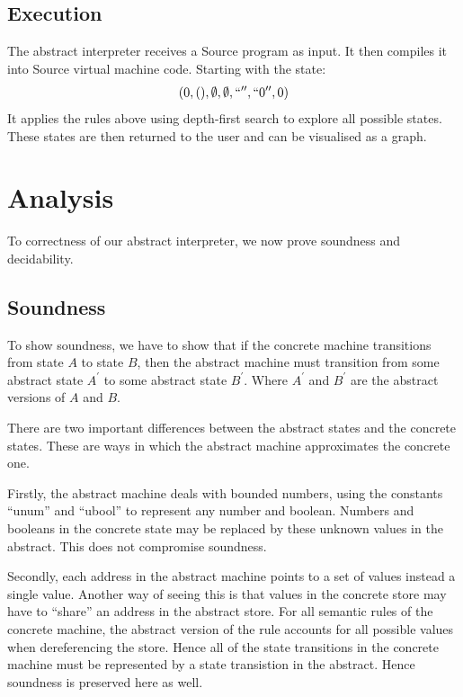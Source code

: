 \documentclass[12pt]{article}
\begin{document}
\subsection{Execution}
The abstract interpreter receives a Source program as input. It then compiles it into Source virtual machine code. Starting with the state:
$$(0,(),\emptyset,\emptyset,``'',``0'',0)$$
It applies the rules above using depth-first search to explore all possible states. These states are then returned to the user and can be visualised as a graph.

\section{Analysis}
To correctness of our abstract interpreter, we now prove soundness and decidability.

\subsection{Soundness}
To show soundness, we have to show that if the concrete machine transitions from state $A$ to state $B$, then the abstract machine must transition from some abstract state $A^{\prime}$ to some abstract state $B^{\prime}$. Where $A^{\prime}$ and $B^{\prime}$ are the abstract versions of $A$ and $B$.

There are two important differences between the abstract states and the concrete states. These are ways in which the abstract machine approximates the concrete one.

Firstly, the abstract machine deals with bounded numbers, using the constants ``unum'' and ``ubool'' to represent any number and boolean. Numbers and booleans in the concrete state may be replaced by these unknown values in the abstract. This does not compromise soundness.

Secondly, each address in the abstract machine points to a set of values instead a single value. Another way of seeing this is that values in the concrete store may have to ``share'' an address in the abstract store. For all semantic rules of the concrete machine, the abstract version of the rule accounts for all possible values when dereferencing the store. Hence all of the state transitions in the concrete machine must be represented by a state transistion in the abstract. Hence soundness is preserved here as well.
\end{document}
